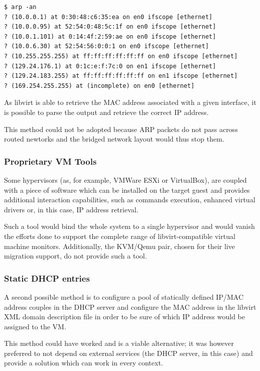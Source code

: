 \begin{lstlisting}
$ arp -an
? (10.0.0.1) at 0:30:48:c6:35:ea on en0 ifscope [ethernet]
? (10.0.0.95) at 52:54:0:48:5c:1f on en0 ifscope [ethernet]
? (10.0.1.101) at 0:14:4f:2:59:ae on en0 ifscope [ethernet]
? (10.0.6.30) at 52:54:56:0:0:1 on en0 ifscope [ethernet]
? (10.255.255.255) at ff:ff:ff:ff:ff:ff on en0 ifscope [ethernet]
? (129.24.176.1) at 0:1c:e:f:7c:0 on en1 ifscope [ethernet]
? (129.24.183.255) at ff:ff:ff:ff:ff:ff on en1 ifscope [ethernet]
? (169.254.255.255) at (incomplete) on en0 [ethernet]
\end{lstlisting}

As libvirt is able to retrieve the MAC address associated with a given interface, it is possible to parse the output and retrieve the correct IP address.

This method could not be adopted because ARP packets do not pass across routed newtorks and the bridged network layout would thus stop them.


\subsubsection{Proprietary VM Tools}

Some hypervisors (as, for example, VMWare ESXi or VirtualBox), are coupled with a piece of software which can be installed on the target guest and provides additional interaction capabilities, such as commands execution, enhanced virtual drivers or, in this case, IP address retrieval.

Such a tool would bind the whole system to a single hypervisor and would vanish the efforts done to support the complete range of libvirt-compatible virtual machine monitors. Additionally, the KVM/Qemu pair, chosen for their live migration support, do not provide such a tool.


\subsubsection{Static DHCP entries}

A second possible method is to configure a pool of statically defined IP/MAC address couples in the DHCP server and configure the MAC address in the libvirt XML domain description file in order to be sure of which IP address would be assigned to the VM.

This method could have worked and is a viable alternative; it was however preferred to not depend on external services (the DHCP server, in this case) and provide a solution which can work in every context.

